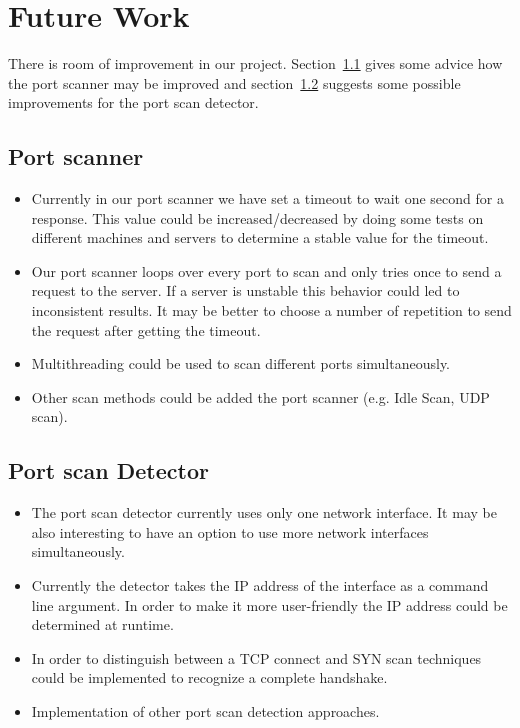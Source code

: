 \documentclass[a4paper]{scrreprt}
\begin{document}



\chapter{Future Work}
There is room of improvement in our project. Section~\ref{sec:improve:scan} gives some advice how the port scanner may be improved and section~\ref{sec:improve:detector} suggests some 
possible improvements for the port scan detector. 
\section{Port scanner}
\label{sec:improve:scan}
\begin{itemize}
\item Currently in our port scanner we have set a timeout to wait one second for a response. This value could be increased/decreased by
doing some tests on different machines and servers to determine a stable value for the timeout.
\item Our port scanner loops over every port to scan and only tries once to send a request to the server. If a server is unstable this behavior could
led to inconsistent results. It may be better to choose a number of repetition to send the request after getting the timeout.
\item Multithreading could be used to scan different ports simultaneously. 
\item Other scan methods could be added the port scanner (e.g. Idle Scan, UDP scan).
\end{itemize}
\section{Port scan Detector}
\label{sec:improve:detector}
\begin{itemize}
\item The port scan detector currently uses only one network interface. It may be also interesting to have an option to use more network interfaces simultaneously.
\item Currently the detector takes the IP address of the interface as a command line argument. In order to make it more user-friendly the IP address could be determined at runtime.
\item In order to distinguish between a TCP connect and SYN scan techniques could be implemented to recognize a complete handshake.
\item Implementation of other port scan detection approaches.
\end{itemize}

\newpage
\end{document}
